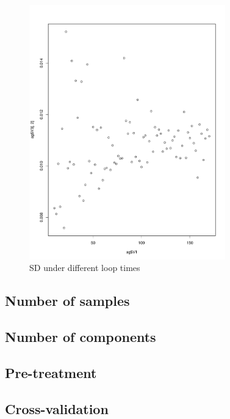 \documentclass[a4paper,12pt,titlepage]{article} %
\numberwithin{equation}{section}  %
\begin{document}
	\begin{figure}[h]    %
	\centering           %
	\includegraphics[width=8.5cm, angle=0]{Number_of_loop_times_mp5-1.pdf}  %
	\vspace*{-0.25cm}    %
	\caption{SD under different loop times}          %
	\label{fig:looptimes}               %
\end{figure}                        %
	
	\subsection{Number of samples}
	\label{sec:Number of Samples}
	
	\subsection{Number of components}
	\label{sec:Number of Components}
	
	\subsection{Pre-treatment}
	\label{sec:Pre-treatment}
	
	\subsection{Cross-validation}
	\label{sec:Cross-Validation}
	
\end{document}
